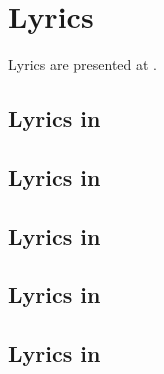 



\chapter{Lyrics}\label{Lyrics}

Lyrics are presented at .


\section{Lyrics in \mxsrToMsr{}}


\section{Lyrics in \mxsrToMsr{}}


\section{Lyrics in \msrToMsr{}}


\section{Lyrics in \msrToLpsr{}}


\section{Lyrics in \lpsrToLilypond{}}


